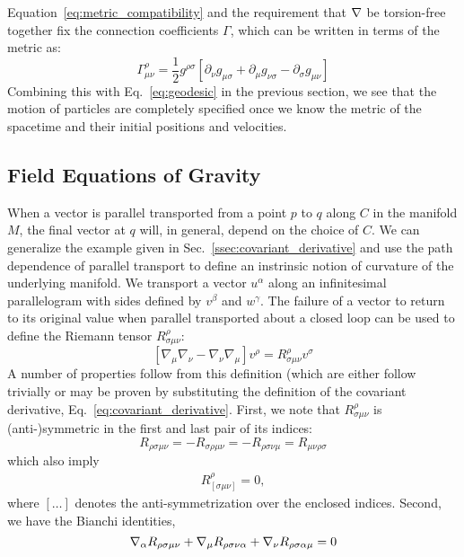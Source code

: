 Equation~\ref{eq:metric_compatibility} and the requirement that $\nabla$ be
torsion-free together fix the connection coefficients $\Gamma$, which can be
written in terms of the metric as:
%
\begin{equation}
\Gamma^{\rho}_{\mu\nu}
= \frac{1}{2} g^{\rho\sigma}\left[
\partial_\nu g_{\mu\sigma}
+ \partial_\mu g_{\nu\sigma}
- \partial_\sigma g_{\mu\nu}
\right]
\end{equation}
% 
Combining this with Eq.~\ref{eq:geodesic} in the previous section,
we see that the motion of particles are completely specified once we know
the metric of the spacetime and their initial positions and velocities.

\subsection{Field Equations of Gravity}

When a vector is parallel transported from a point $p$ to $q$ along $C$ in the
manifold $M$, the final vector at $q$ will, in general, depend on the choice of
$C$. We can generalize the example given in Sec.~\ref{ssec:covariant_derivative}
and use the path dependence of parallel transport to define an instrinsic notion
of curvature of the underlying manifold. We transport a vector $u^\alpha$ along
an infinitesimal parallelogram with sides defined by $v^\beta$ and $w^\gamma$.
The failure of a vector to return to its original value when parallel 
transported about a closed loop can be used to define the Riemann tensor
$R^\rho_{\sigma\mu\nu}$:
% 
% 
%
\begin{equation}
\label{eq:riemann_def}
\left[\nabla_\mu \nabla_\nu - \nabla_\nu \nabla_\mu\right] v^\rho
= R^\rho_{\sigma\mu\nu} v^\sigma
\end{equation}
%
A number of properties follow from this definition (which are either
follow trivially or may be proven by substituting the definition of the
covariant derivative, Eq.~\ref{eq:covariant_derivative}.  First, we note that
$R^\rho_{\sigma\mu\nu}$ is (anti-)symmetric in the first and last pair of 
its indices:
%
\begin{equation}
\label{eq:symmetries}
R_{\rho\sigma\mu\nu}
= -R_{\sigma\rho\mu\nu}
= -R_{\rho\sigma\nu\mu}
= R_{\mu\nu\rho\sigma}
\end{equation}
%
which also imply
%
\begin{align}
R^\rho_{[\sigma\mu\nu]} = 0,
\end{align}
where $[\dots]$ denotes the anti-symmetrization over the enclosed indices.
Second, we have the Bianchi identities,
%
\begin{equation}
\label{eq:bianchi}
\cd_\alpha R_{\rho\sigma\mu\nu}
+\cd_\mu R_{\rho\sigma\nu\alpha}
+\cd_\nu R_{\rho\sigma\alpha\mu} = 0
\end{equation}

